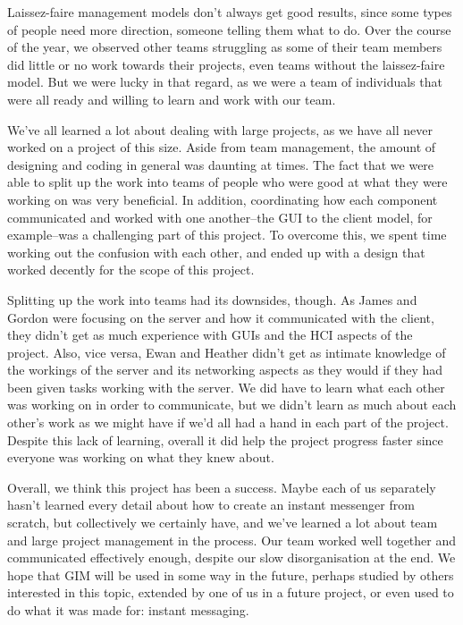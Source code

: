 Laissez-faire management models don't always get good results, since some types of people need more direction, someone telling them what to do. Over the course of the year, we observed other teams struggling as some of their team members did little or no work towards their projects, even teams without the laissez-faire model. But we were lucky in that regard, as we were a team of individuals that were all ready and willing to learn and work with our team.

We've all learned a lot about dealing with large projects, as we have all never worked on a project of this size. Aside from team management, the amount of designing and coding in general was daunting at times. The fact that we were able to split up the work into teams of people who were good at what they were working on was very beneficial. In addition, coordinating how each component communicated and worked with one another--the GUI to the client model, for example--was a challenging part of this project. To overcome this, we spent time working out the confusion with each other, and ended up with a design that worked decently for the scope of this project.

Splitting up the work into teams had its downsides, though. As James and Gordon were focusing on the server and how it communicated with the client, they didn't get as much experience with GUIs and the HCI aspects of the project. Also, vice versa, Ewan and Heather didn't get as intimate knowledge of the workings of the server and its networking aspects as they would if they had been given tasks working with the server. We did have to learn what each other was working on in order to communicate, but we didn't learn as much about each other's work as we might have if we'd all had a hand in each part of the project. Despite this lack of learning, overall it did help the project progress faster since everyone was working on what they knew about.

Overall, we think this project has been a success. Maybe each of us separately hasn't learned every detail about how to create an instant messenger from scratch, but collectively we certainly have, and we've learned a lot about team and large project management in the process. Our team worked well together and communicated effectively enough, despite our slow disorganisation at the end. We hope that GIM will be used in some way in the future, perhaps studied by others interested in this topic, extended by one of us in a future project, or even used to do what it was made for: instant messaging.

